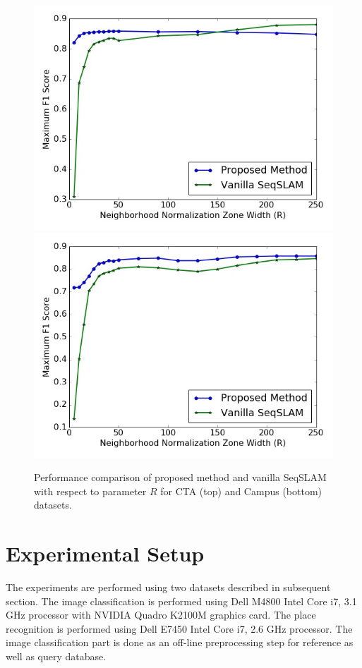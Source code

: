 \documentclass[letterpaper, 10 pt, conference]{ieeeconf}  %
\begin{document}
\begin{figure}
 \includegraphics[scale=0.4]{RPerformance1} \\
 \includegraphics[scale=0.4]{RPerformance2}
 \caption{Performance comparison of proposed method and vanilla SeqSLAM with respect to parameter $R$ for CTA (top) and Campus (bottom) datasets.}
 \label{fig:RPerformance}
\end{figure}


\section{Experimental Setup}
The experiments are performed using two datasets described in subsequent section. The image classification is performed using Dell M4800 Intel Core i7, 3.1 GHz processor with NVIDIA Quadro K2100M graphics card. The place recognition is performed using Dell E7450 Intel Core i7, 2.6 GHz processor. The image classification part is done as an off-line preprocessing step for reference as well as query database.
\end{document}
